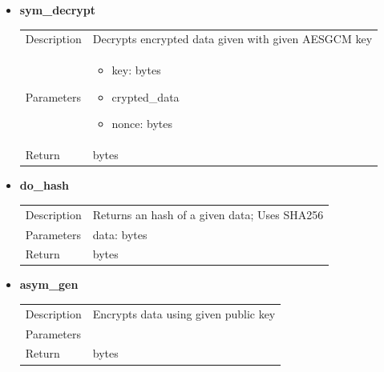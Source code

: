 \documentclass[11pt]{article}
\begin{document}
\begin{itemize}
  


\item
  \textbf{sym\_decrypt} 
  
  	
  \begin{longtable}[]{@{}ll@{}}
  \toprule
  \endhead
  Description & Decrypts encrypted data given with given AESGCM key\tabularnewline
  \begin{minipage}[t]{0.40\columnwidth}\raggedright
  Parameters\strut
  \end{minipage} & \begin{minipage}[t]{0.54\columnwidth}\raggedright
  \begin{itemize}
  	\item key: bytes
  	\item crypted\_data
  	\item  nonce: bytes
  \end{itemize} \strut
  \end{minipage}\tabularnewline
  \begin{minipage}[t]{0.40\columnwidth}\raggedright
  Return \strut
  \end{minipage} & \begin{minipage}[t]{0.54\columnwidth}\raggedright
	bytes \strut
  \end{minipage}\tabularnewline
  \bottomrule
  \end{longtable}
  
\item
  \textbf{do\_hash}

  \begin{longtable}[]{@{}ll@{}}
  \toprule
  \endhead
  Description & Returns an hash of a given data; Uses
  SHA256\tabularnewline
  Parameters & data: bytes\tabularnewline
  Return & bytes\tabularnewline
  \bottomrule
  \end{longtable}
\item
  \textbf{asym\_gen}

  \begin{longtable}[]{@{}ll@{}}
  \toprule
  \endhead
  Description & Encrypts data using given public key\tabularnewline
  Parameters &\tabularnewline
  Return & bytes\tabularnewline
  \bottomrule
  \end{longtable}
  

\end{itemize}
\end{document}
